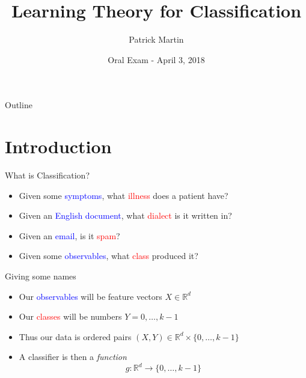 \documentclass{beamer}
\title %
{Learning Theory for Classification}
\author %
{Patrick Martin}
\institute %
{Department of Mathematics\\
Johns Hopkins University}
\date %
{Oral Exam - April 3, 2018}
\newcommand{\R}{\mathbb{R}}
\begin{document}
\begin{frame}
  \titlepage
\end{frame}

\begin{frame}{Outline}
  \tableofcontents
\end{frame}




\section{Introduction}
\begin{frame}{What is Classification?}
\begin{itemize}
\item Given some \textcolor{blue}{symptoms}, what \textcolor{red}{illness} does a patient have?
\item Given an \textcolor{blue}{English document}, what \textcolor{red}{dialect} is it written in? 
\item Given an \textcolor{blue}{email}, is it \textcolor{red}{spam}?
\item Given some \textcolor{blue}{observables}, what \textcolor{red}{class} produced it?
\end{itemize}
\end{frame}

\begin{frame}{Giving some names}
\begin{itemize}
\item Our \textcolor{blue}{observables} will be feature vectors $X \in \R^d$
\item Our \textcolor{red}{classes} will be numbers $Y=0,\ldots,k-1$
\item Thus our data is ordered pairs $(X,Y) \in \R^d \times \{0,\ldots,k-1\}$
\item A classifier is then a \emph{function}
\[ g: \R^d \to \{0,\ldots, k-1\} \]
\end{itemize}
\end{frame}
\end{document}
